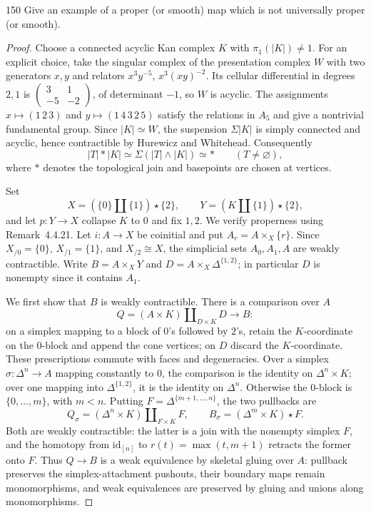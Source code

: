 \begin{exercise}{150}
Give an example of a proper (or smooth) map which is not universally proper
(or smooth).

\begin{proof}
Choose a connected acyclic Kan complex $K$ with
$\pi_1(|K|)\ne1$.
For an explicit choice, take the singular complex of the presentation
complex $W$ with two generators $x,y$ and relators
$x^3y^{-5}$, $x^3(xy)^{-2}$.
Its cellular differential in degrees $2,1$ is
$\left(\begin{smallmatrix}3&1\\-5&-2\end{smallmatrix}\right)$,
of determinant $-1$, so $W$ is acyclic.
The assignments $x\mapsto(1\,2\,3)$ and
$y\mapsto(1\,4\,3\,2\,5)$ satisfy the relations in $A_5$
and give a nontrivial fundamental group.
Since $|K|\simeq W$, the suspension $\Sigma|K|$ is simply connected
and acyclic, hence contractible by Hurewicz and Whitehead.
Consequently
\[
 |T|*|K|\simeq\Sigma(|T|\wedge|K|)\simeq *
 \qquad(T\ne\varnothing),
\]
where $*$ denotes the topological join and basepoints are chosen at
vertices.

Set
\[
 X=(\{0\}\amalg\{1\})\star\{2\},\qquad
 Y=(K\amalg\{1\})\star\{2\},
\]
and let $p\colon Y\to X$ collapse $K$ to $0$ and fix $1,2$.
We verify properness using Remark~4.4.21.
Let $i\colon A\to X$ be coinitial and put
$A_r=A\times_X\{r\}$.
Since $X_{/0}=\{0\}$, $X_{/1}=\{1\}$, and $X_{/2}\cong X$,
the simplicial sets $A_0,A_1,A$ are weakly contractible.
Write $B=A\times_XY$ and $D=A\times_X\Delta^{\{1,2\}}$;
in particular $D$ is nonempty since it contains $A_1$.

We first show that $B$ is weakly contractible.
There is a comparison over $A$
\[
 Q=(A\times K)\amalg_{D\times K}D\longrightarrow B:
\]
on a simplex mapping to a block of $0$'s followed by $2$'s, retain
the $K$-coordinate on the $0$-block and append the cone vertices;
on $D$ discard the $K$-coordinate.
These prescriptions commute with faces and degeneracies.
Over a simplex $\sigma\colon\Delta^n\to A$ mapping constantly to $0$,
the comparison is the identity on $\Delta^n\times K$;
over one mapping into $\Delta^{\{1,2\}}$, it is the identity on $\Delta^n$.
Otherwise the $0$-block is $\{0,\ldots,m\}$, with $m<n$.
Putting $F=\Delta^{\{m+1,\ldots,n\}}$, the two pullbacks are
\[
 Q_\sigma=(\Delta^n\times K)\amalg_{F\times K}F,
 \qquad B_\sigma=(\Delta^m\times K)\star F.
\]
Both are weakly contractible: the latter is a join with the nonempty
simplex $F$, and the homotopy from $\mathrm{id}_{[n]}$ to
$r(t)=\max(t,m+1)$ retracts the former onto $F$.
Thus $Q\to B$ is a weak equivalence by skeletal gluing over $A$:
pullback preserves the simplex-attachment pushouts, their boundary
maps remain monomorphisms, and weak equivalences are preserved by
gluing and unions along monomorphisms.


\end{proof}
\end{exercise}
